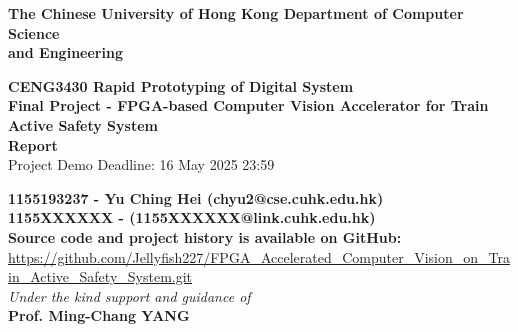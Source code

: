 \documentclass[12pt, a4paper]{article}
\begin{document}
\begin{titlepage}
    \begin{center}

		\bf\LARGE{The Chinese University of Hong Kong}
        \bf\Large{Department of Computer Science\\and Engineering}
		
		\vspace{80pt}
		
		\vspace{15pt}
		\textbf{\Large CENG3430 Rapid Prototyping of Digital System\\}
		\vspace{10pt}
		\textbf{\Large Final Project - FPGA-based Computer Vision Accelerator for Train Active Safety System}\\
		\vspace{10pt}
		\textbf{\Large Report}\\
        \vspace{6pt}
        {\large Project Demo Deadline: 16 May 2025 23:59}
		\vspace{40pt}
		
        \vspace{15pt}
		\textbf{\normalsize
            1155193237 - Yu Ching Hei (chyu2@cse.cuhk.edu.hk)\\
            1155XXXXXX -  (1155XXXXXX@link.cuhk.edu.hk)\\
        }
		\vspace{40pt}
        \textbf{\large Source code and project history is available on GitHub:}\\
        \normalsize \url{https://github.com/Jellyfish227/FPGA_Accelerated_Computer_Vision_on_Train_Active_Safety_System.git}\\
        \vspace{60pt}
		\textit{Under the kind support and guidance of}\\
		\textbf{\large Prof. Ming-Chang YANG}\\
		\vspace{20pt}
		
	\end{center}
\end{titlepage}
\setcounter{page}{2}
\end{document}
